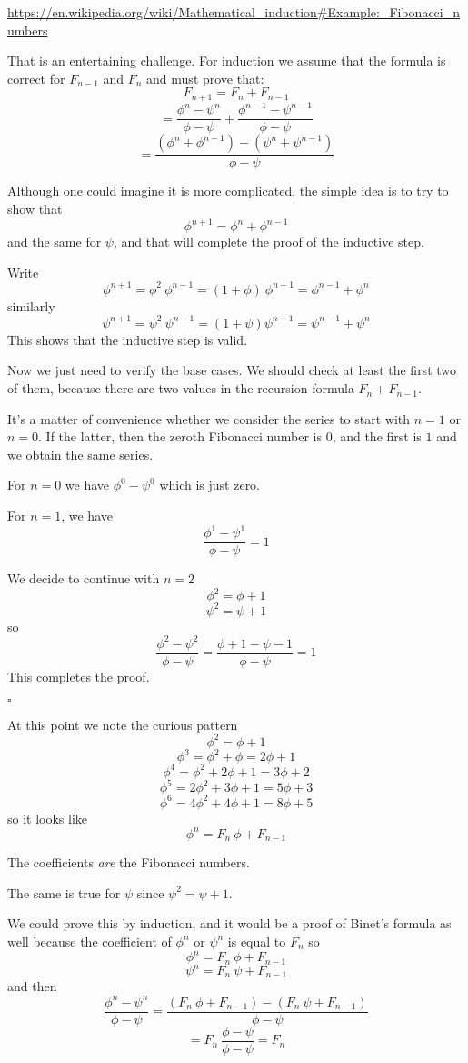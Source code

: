 \documentclass[11pt, oneside]{article}
\begin{document}
\url{https://en.wikipedia.org/wiki/Mathematical_induction#Example:_Fibonacci_numbers}

That is an entertaining challenge.  For induction we assume that the formula is correct for $F_{n-1}$ and $F_n$ and must prove that:
\[ F_{n+1} = F_n + F_{n-1} \]
\[ = \frac{\phi^n - \psi^n}{\phi - \psi} + \frac{\phi^{n-1} - \psi^{n-1}}{\phi - \psi} \]
\[ = \frac{(\phi^n + \phi^{n-1}) - (\psi^{n} + \psi^{n-1})}{\phi - \psi} \]

Although one could imagine it is more complicated, the simple idea is to try to show that
\[ \phi^{n+1} = \phi^n + \phi^{n-1} \]
and the same for $\psi$, and that will complete the proof of the inductive step.

Write
\[ \phi^{n+1} = \phi^2 \ \phi^{n - 1} = (1 + \phi) \ \phi^{n - 1} = \phi^{n-1} + \phi^n  \]
similarly
\[ \psi^{n+1} = \psi^2 \ \psi^{n - 1} = (1 + \psi)\psi^{n-1} = \psi^{n-1} + \psi^n \]
This shows that the inductive step is valid.

Now we just need to verify the base cases.  We should check at least the first two of them, because there are two values in the recursion formula $F_{n} + F_{n-1}$.

It's a matter of convenience whether we consider the series to start with $n=1$ or $n=0$.  If the latter, then the zeroth Fibonacci number is $0$, and the first is $1$ and we obtain the same series.

For $n = 0$ we have $\phi^0 - \psi^0$ which is just zero.

For $n = 1$, we have 
\[ \frac{\phi^1 - \psi^1}{\phi - \psi}  = 1 \]

We decide to continue with $n = 2$
\[ \phi^2 = \phi + 1 \]
\[ \psi^2 = \psi + 1 \]
so
\[ \frac{\phi^2 - \psi^2}{\phi - \psi} = \frac{\phi + 1 - \psi - 1}{\phi - \psi} = 1 \]
This completes the proof. 

$\square$

At this point we note the curious pattern
\[ \phi^2 = \phi + 1 \]
\[ \phi^3 = \phi^2 + \phi = 2 \phi + 1 \]
\[ \phi^4 = \phi^2 + 2 \phi + 1 = 3 \phi + 2 \]
\[ \phi^5 = 2 \phi^2 + 3 \phi + 1 =  5 \phi + 3 \] 
\[ \phi^6 = 4 \phi^2 + 4 \phi + 1 = 8 \phi + 5 \]
so it looks like
\[ \phi^n = F_n \ \phi + F_{n-1} \]

The coefficients \emph{are} the Fibonacci numbers.  

The same is true for $\psi$ since $\psi^2 = \psi + 1$.

We could prove this by induction, and it would be a proof of Binet's formula as well because the coefficient of $\phi^n$ or $\psi^n$ is equal to $F_n$ so
\[ \phi^n = F_n \ \phi + F_{n-1} \]
\[ \psi^n = F_n \ \psi + F_{n-1} \]
and then
\[ \frac{\phi^n - \psi^n}{\phi - \psi} = \frac{(F_n \ \phi + F_{n-1}) - (F_n \ \psi + F_{n-1})}{\phi - \psi} \]
\[ = F_n \ \frac{\phi - \psi}{\phi - \psi}  = F_n \]
\end{document}
